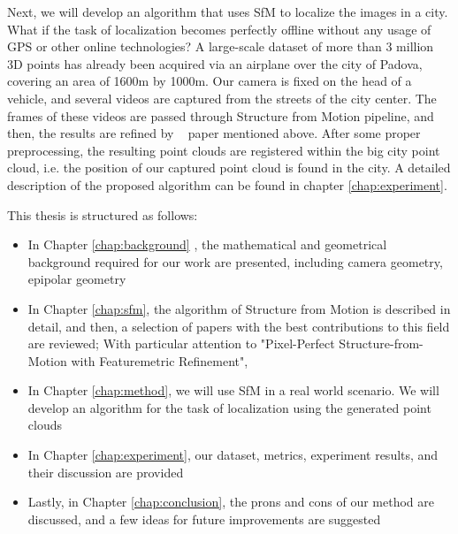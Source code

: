 \documentclass[11pt]{article}
\begin{document}
    Next, we will develop an algorithm that uses SfM to localize the images
    in a city. What if the task of localization becomes perfectly offline without any usage of GPS or other online technologies?
    A large-scale dataset of more than 3 million 3D points has already been acquired via an airplane over the city of Padova,
    covering an area of 1600m by 1000m. Our camera is fixed on the head of a vehicle, and several videos are captured
    from the streets of the city center. The frames of these videos are passed through Structure from Motion
    pipeline, and then, the results are refined by ~\cite{lindenberger2021pixsfm} paper mentioned above. After some
    proper preprocessing, the resulting point clouds are registered within the big city point cloud, i.e. the position
    of our captured point cloud is found in the city. A detailed description of the proposed algorithm can be found in
    chapter \ref{chap:experiment}.

    This thesis is structured as follows:
    \begin{itemize}
        \item In Chapter \ref{chap:background} , the mathematical and geometrical background required for our work are presented, including camera geometry, epipolar geometry
        \item In Chapter \ref{chap:sfm}, the algorithm of Structure from Motion is described in detail, and then, a selection of papers with the best contributions to this field are reviewed; With particular attention to "Pixel-Perfect Structure-from-Motion with Featuremetric Refinement", ~\cite{lindenberger2021pixsfm}
        \item In Chapter \ref{chap:method}, we will use SfM in a real world scenario. We will develop an algorithm for the task of localization using the generated point clouds
        \item In Chapter \ref{chap:experiment}, our dataset, metrics, experiment results, and their discussion are provided
        \item Lastly, in Chapter \ref{chap:conclusion}, the prons and cons of our method are discussed, and a few ideas for future improvements are suggested
    \end{itemize}
\end{document}
